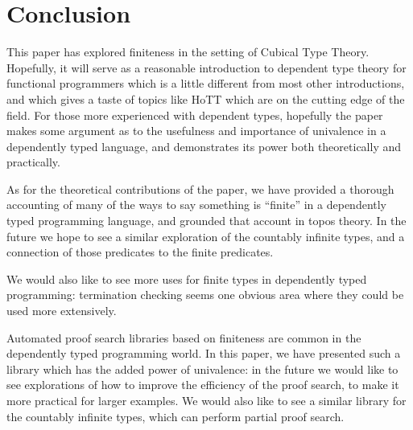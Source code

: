 \section{Conclusion}
This paper has explored finiteness in the setting of Cubical Type Theory.
Hopefully, it will serve as a reasonable introduction to dependent type theory
for functional programmers which is a little different from most other
introductions, and which gives a taste of topics like HoTT which are on the
cutting edge of the field.
For those more experienced with dependent types, hopefully the paper makes some
argument as to the usefulness and importance of univalence in a dependently
typed language, and demonstrates its power both theoretically and practically.

As for the theoretical contributions of the paper, we have provided a thorough
accounting of many of the ways to say something is ``finite'' in a
dependently typed programming language, and grounded that account in topos
theory.
In the future we hope to see a similar exploration of the countably infinite
types, and a connection of those predicates to the finite predicates.

We would also like to see more uses for finite types in dependently typed
programming: termination checking seems one obvious area where they could be
used more extensively.

Automated proof search libraries based on finiteness are common in the
dependently typed programming world.
In this paper, we have presented such a library which has the added power of
univalence: in the future we would like to see explorations of how to improve
the efficiency of the proof search, to make it more practical for larger
examples.
We would also like to see a similar library for the countably infinite types,
which can perform partial proof search.

